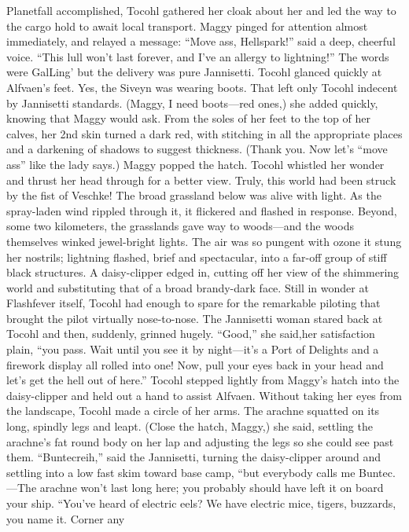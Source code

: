 \documentclass[9pt]{article}
\begin{document}
Planetfall accomplished, Tocohl gathered her cloak about her and led the way to the cargo hold to
await local transport. Maggy pinged for attention almost immediately, and relayed a message: “Move ass,
Hellspark!” said a deep, cheerful voice. “This lull won’t last forever, and I’ve an allergy to lightning!” The
words were GalLing’ but the delivery was pure Jannisetti.
Tocohl glanced quickly at Alfvaen’s feet. Yes, the Siveyn was wearing boots. That left only Tocohl
indecent by Jannisetti standards. (Maggy, I need boots—red ones,) she added quickly, knowing that
Maggy would ask. From the soles of her feet to the top of her calves, her 2nd skin turned a dark red,
with stitching in all the appropriate places and a darkening of shadows to suggest thickness. (Thank you.
Now let’s “move ass” like the lady says.)
Maggy popped the hatch. Tocohl whistled her wonder and thrust her head through for a better view.
Truly, this world had been struck by the fist of Veschke!
The broad grassland below was alive with light. As the spray-laden wind rippled through it, it
flickered and flashed in response. Beyond, some two kilometers, the grasslands gave way to
woods—and the woods themselves winked jewel-bright lights. The air was so pungent with ozone it
stung her nostrils; lightning flashed, brief and spectacular, into a far-off group of stiff black structures.
A daisy-clipper edged in, cutting off her view of the shimmering world and substituting that of a broad
brandy-dark face. Still in wonder at Flashfever itself, Tocohl had enough to spare for the remarkable
piloting that brought the pilot virtually nose-to-nose.
The Jannisetti woman stared back at Tocohl and then, suddenly, grinned hugely. “Good,” she said,her satisfaction plain, “you pass. Wait until you see it by night—it’s a Port of Delights and a firework
display all rolled into one! Now, pull your eyes back in your head and let’s get the hell out of here.”
Tocohl stepped lightly from Maggy’s hatch into the daisy-clipper and held out a hand to assist
Alfvaen. Without taking her eyes from the landscape, Tocohl made a circle of her arms. The arachne
squatted on its long, spindly legs and leapt. (Close the hatch, Maggy,) she said, settling the arachne’s fat
round body on her lap and adjusting the legs so she could see past them.
“Buntecreih,” said the Jannisetti, turning the daisy-clipper around and settling into a low fast skim
toward base camp, “but everybody calls me Buntec.—The arachne won’t last long here; you probably
should have left it on board your ship.
“You’ve heard of electric eels? We have electric mice, tigers, buzzards, you name it. Corner any
\end{document}
